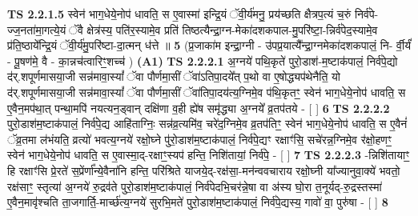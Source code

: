 \documentclass[17pt]{extarticle}
\begin{document}
                  \newline
                                \textbf{ TS 2.2.1.5} \newline
                  स्वेन॑ भाग॒धेये॒नोप॑ धावति॒ स ए॒वास्मा॑ इन्द्रि॒यं ॅवी॒र्य॑मनु॒ प्रय॑च्छति क्षैत्रप॒त्यं च॒रुं निर्व॑पे-ज्ज॒नता॑मा॒गत्ये॒यं ॅवै क्षेत्र॑स्य॒ पति॑र॒स्यामे॒व प्रति॑ तिष्ठत्यैन्द्रा॒ग्न-मेका॑दशकपाल-मु॒परि॑ष्टा॒-न्निर्व॑पेद॒स्यामे॒व प्र॑ति॒ष्ठाये᳚न्द्रि॒यं ॅवी॒र्य॑मु॒परि॑ष्टा-दा॒त्मन् ध॑त्ते ॥ \textbf{  5} \newline
                  \newline
                      (प्र॒जाका॑म इन्द्रा॒ग्नी - उ॑पप्र॒यात्यै᳚न्द्रा॒ग्नमेका॑दशकपालं॒ नि- र्वी॒र्यं॑ - पू॒षण॑मे॒ वै - का॒न्नच॑त्वारिꣳ॒॒शच्च॑ )  \textbf{(A1)} \newline \newline
                                        \textbf{ TS 2.2.2.1} \newline
                  अ॒ग्नये॑ पथि॒कृते॑ पुरो॒डाश॑-म॒ष्टाक॑पालं॒ निर्व॑पे॒द्यो द॑र्.शपूर्णमासया॒जी सन्न॑मावा॒स्यां᳚ ॅवा पौर्णमा॒सीं ॅवा॑ऽतिपा॒दये᳚त् प॒थो वा ए॒षोद्ध्यप॑थेनैति॒ यो द॑र्.शपूर्णमासया॒जी सन्न॑मावा॒स्यां᳚ ॅवा पौर्णमा॒सीं ॅवा॑तिपा॒दय॑त्य॒ग्निमे॒व प॑थि॒कृतꣳ॒॒ स्वेन॑ भाग॒धेये॒नोप॑ धावति॒ स ए॒वैन॒मप॑था॒त् पन्था॒मपि॑ नयत्यन॒ड्वान् दक्षि॑णा व॒ही ह्ये॑ष समृ॑द्ध्या अ॒ग्नये᳚ व्र॒तप॑तये - [  ] \textbf{  6} \newline
                  \newline
                                \textbf{ TS 2.2.2.2} \newline
                  पुरो॒डाश॑म॒ष्टाक॑पालं॒ निर्व॑पे॒द्य आहि॑ताग्निः॒ सन्न॑व्र॒त्यमि॑व॒ चरे॑द॒ग्निमे॒व व्र॒तप॑तिꣳ॒॒ स्वेन॑ भाग॒धेये॒नोप॑ धावति॒ स ए॒वैनं॑ ॅव्र॒तमा ल॑भंयति॒ व्रत्यो॑ भवत्य॒ग्नये॑ रक्षो॒घ्ने पु॑रो॒डाश॑म॒ष्टाक॑पालं॒ निर्व॑पे॒द्यꣳ रक्षाꣳ॑सि॒ सचे॑रन्न॒ग्निमे॒व र॑क्षो॒हणꣳ॒॒ स्वेन॑ भाग॒धेये॒नोप॑ धावति॒ स ए॒वास्मा॒द्-रक्षाꣳ॒॒स्यप॑ हन्ति॒ निशि॑तायां॒ निर्व॑पे॒ - [  ] \textbf{  7} \newline
                  \newline
                                \textbf{ TS 2.2.2.3} \newline
                  -न्निशि॑तायाꣳ॒॒ हि रक्षाꣳ॑सि प्रे॒रते॑ स॒प्रेंर्णा᳚न्ये॒वैना॑नि हन्ति॒ परि॑श्रिते याजये॒द्-रक्ष॑सा॒-मन॑न्ववचाराय रक्षो॒घ्नी या᳚ज्यानुवा॒क्ये॑ भवतो॒ रक्ष॑साꣳ॒॒ स्तृत्या॑ अ॒ग्नये॑ रु॒द्रव॑ते पुरो॒डाश॑म॒ष्टाक॑पालं॒ निर्व॑पेदभि॒चर॑न्ने॒षा वा अ॑स्य घो॒रा त॒नूर्यद्-रु॒द्रस्तस्मा॑ ए॒वैन॒मावृ॑श्चति ता॒जगार्ति॒-मार्च्छ॑त्य॒ग्नये॑ सुरभि॒मते॑ पुरो॒डाश॑म॒ष्टाक॑पालं॒ निर्व॑पे॒द्यस्य॒ गावो॑ वा॒ पुरु॑षा - [  ] \textbf{  8} \newline
\end{document}
